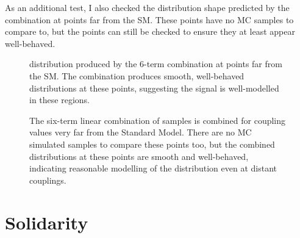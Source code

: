     As an additional test, I also checked the distribution shape predicted by the combination at points far from the SM.
    These points have no MC samples to compare to, but the points can still be checked to ensure they at least appear well-behaved.

    \begin{figure}[tbh]
        \centering
        \caption{
            \mhh distribution produced by the 6-term combination at points far from the SM.
            The combination produces smooth, well-behaved distributions at these points,
                suggesting the signal is well-modelled in these regions.
        }
        \label{fig:vbf_hh_6term_preview}
    \end{figure}

    \begin{figure}[tbh]
    	\centering
        \caption{
            The six-term linear combination of samples is combined for coupling values very far from the Standard Model.
            There are no MC simulated samples to compare these points too, but the combined distributions at these points are smooth and well-behaved,
                indicating reasonable modelling of the distribution even at distant couplings.
        }
        \label{fig:vbf_hh_preview}
    \end{figure}


\section{Solidarity} \label{sec:solidarity}
    
